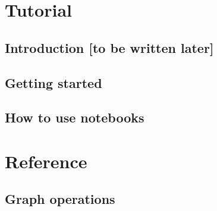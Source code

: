 


\makeindex[intoc]






\hypertarget{contents}{}
\tableofcontents

\mainmatter
{}

\part{Tutorial}

\cleardoublepage
{}

\chapter*{Introduction [to be written later]}
\FILL

\chapter{Getting started}


\chapter{How to use notebooks}


\part{Reference}


\chapter{Graph operations}
\label{graph-operations}


